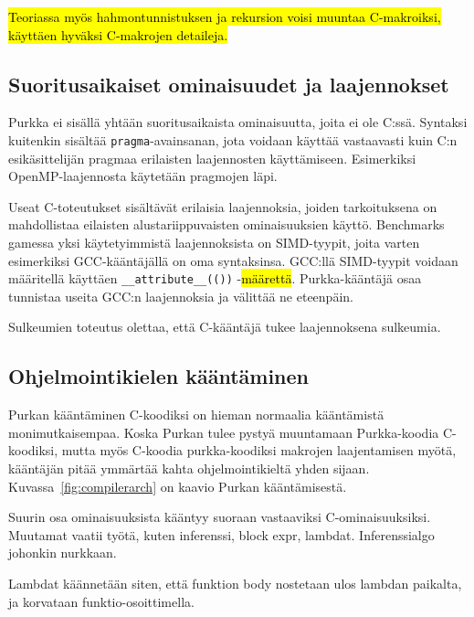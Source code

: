 \hl{Teoriassa myös hahmontunnistuksen ja rekursion voisi muuntaa C-makroiksi,
käyttäen hyväksi C-makrojen detaileja.}

\subsection{Suoritusaikaiset ominaisuudet ja laajennokset}

Purkka ei sisällä yhtään suoritusaikaista ominaisuutta, joita ei ole C:ssä.
Syntaksi kuitenkin sisältää \texttt{pragma}-avainsanan, jota voidaan käyttää
vastaavasti kuin C:n esikäsittelijän pragmaa erilaisten laajennosten
käyttämiseen. Esimerkiksi OpenMP-laajennosta käytetään pragmojen läpi.

Useat C-toteutukset sisältävät erilaisia laajennoksia, joiden tarkoituksena on
mahdollistaa eilaisten alustariippuvaisten ominaisuuksien käyttö. Benchmarks
gamessa yksi käytetyimmistä laajennoksista on SIMD-tyypit, joita varten
esimerkiksi GCC-kääntäjällä on oma syntaksinsa. GCC:llä SIMD-tyypit voidaan
määritellä käyttäen \texttt{\_\_attribute\_\_(())} -\hl{määrettä}.
Purkka-kääntäjä osaa tunnistaa useita GCC:n laajennoksia ja välittää ne
eteenpäin.

Sulkeumien toteutus olettaa, että C-kääntäjä tukee laajennoksena sulkeumia.

\subsection{Ohjelmointikielen kääntäminen}

Purkan kääntäminen C-koodiksi on hieman normaalia kääntämistä monimutkaisempaa.
Koska Purkan tulee pystyä muuntamaan Purkka-koodia C-koodiksi, mutta myös
C-koodia purkka-koodiksi makrojen laajentamisen myötä, kääntäjän pitää ymmärtää
kahta ohjelmointikieltä yhden sijaan. Kuvassa~\ref{fig:compilerarch} on kaavio
Purkan kääntämisestä.

Suurin osa ominaisuuksista kääntyy suoraan vastaaviksi C-ominaisuuksiksi.
Muutamat vaatii työtä, kuten inferenssi, block expr, lambdat. Inferenssialgo
johonkin nurkkaan.

Lambdat käännetään siten, että funktion body nostetaan ulos lambdan paikalta,
ja korvataan funktio-osoittimella.

